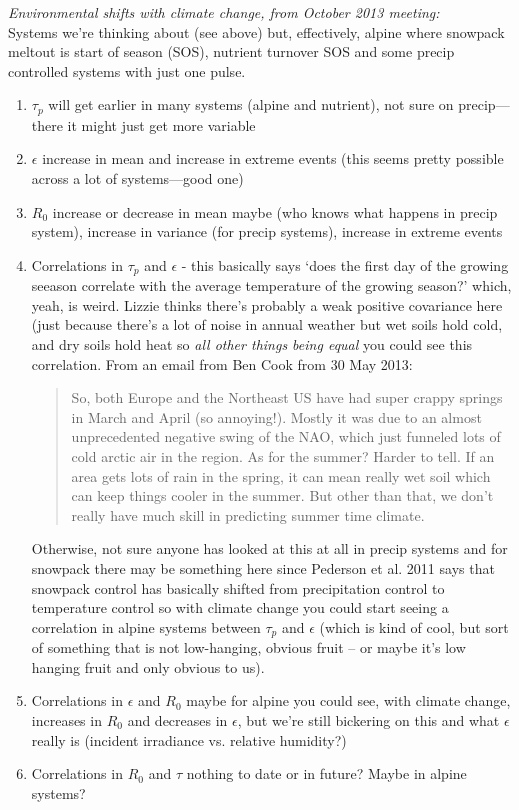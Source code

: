 \documentclass[11pt,a4paper,oneside]{article}
\begin{document}
\noindent \emph{Environmental shifts with climate change, from October 2013 meeting:}\\
Systems we're thinking about (see above) but, effectively, alpine where snowpack meltout is start of season (SOS), nutrient turnover SOS and some precip controlled systems with just one pulse. 
\begin{enumerate}
\item \(\tau_{p}\) will get earlier in many systems (alpine and nutrient), not sure on precip---there it might just get more variable
\item \(\epsilon\) increase in mean and increase in extreme events (this seems pretty possible across a lot of systems---good one)
\item \(R_{0}\) increase or decrease in mean maybe (who knows what happens in precip system), increase in variance (for precip systems), increase in extreme events 
\item Correlations in \(\tau_{p}\) and \(\epsilon\) - this basically says `does the first day of the growing seeason correlate with the average temperature of the growing season?' which, yeah, is weird. Lizzie thinks there's probably a weak positive covariance here (just because there's a lot of noise in annual weather but wet soils hold cold, and dry soils hold heat so \emph{all other things being equal} you could see this correlation. From an email from Ben Cook from 30 May 2013:
\begin{quote}
So, both Europe and the Northeast US have had super crappy springs in March and April (so annoying!). Mostly it was due to an almost unprecedented negative swing of the NAO, which just funneled lots of cold arctic air in the region. As for the summer? Harder to tell. If an area gets lots of rain in the spring, it can mean really wet soil which can keep things cooler in the summer. But other than that, we don't really have much skill in predicting summer time climate. 
\end{quote}
Otherwise, not sure anyone has looked at this at all in precip systems and for snowpack there may be something here since Pederson et al. 2011 says that snowpack control has basically shifted from precipitation control to temperature control so with climate change you could start seeing a correlation in alpine systems between \(\tau_{p}\) and \(\epsilon\) (which is kind of cool, but sort of something that is not low-hanging, obvious fruit -- or maybe it's low hanging fruit and only obvious to us).
\item Correlations in \(\epsilon\) and \(R_{0}\) maybe for alpine you could see, with climate change, increases in \(R_{0}\)  and decreases in \(\epsilon\), but we're still bickering on this and what \(\epsilon\) really is (incident irradiance vs. relative humidity?)
\item Correlations in \(R_{0}\) and \(\tau\) nothing to date or in future? Maybe in alpine systems?
\end{enumerate}
\end{document}
